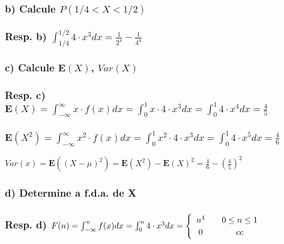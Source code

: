 \documentclass[english]{article}
\begin{document}
\subsubsection*{\textmd{b) Calcule $P(1/4<X<1/2)$}}


\subsubsection*{\textmd{Resp. b) $\int_{1/4}^{1/2}4\cdot x^{3}dx=\frac{1}{2^{4}}-\frac{1}{4^{4}}$}}


\subsubsection*{\textmd{c) Calcule $\mathbf{E}(X)$, $Var(X)$}}


\subsubsection*{\textmd{Resp. c) $\mathbf{E}(X)=\int_{-\infty}^{\infty}x\cdot f(x)dx=\int_{0}^{1}x\cdot4\cdot x^{3}dx=\int_{0}^{1}4\cdot x^{4}dx=\frac{4}{5}$}}


\subsubsection*{\textmd{$\mathbf{E}(X^{2})=\int_{-\infty}^{\infty}x{}^{2}\cdot f(x)dx=\int_{0}^{1}x^{2}\cdot4\cdot x^{3}dx=\int_{0}^{1}4\cdot x^{5}dx=\frac{4}{6}$}}

\textbf{$Var(x)=\mathbf{E}((X-\mu)^{2})=\mathbf{E}(X^{2})-\mathbf{E}(X)^{2}=\frac{4}{6}-(\frac{4}{5})^{2}$}


\subsubsection*{\textmd{d) Determine a f.d.a. de X}}


\subsubsection*{\textmd{Resp. d) $F(n)=\int_{-\infty}^{n}f(x)dx=\int_{0}^{n}4\cdot x^{3}dx=\protect\begin{cases}
\protect\begin{array}{c}
n^{4}\protect\\
0
\protect\end{array} & \protect\begin{array}{c}
0\leq n\leq1\protect\\
cc
\protect\end{array}\protect\end{cases}$}}
\end{document}
